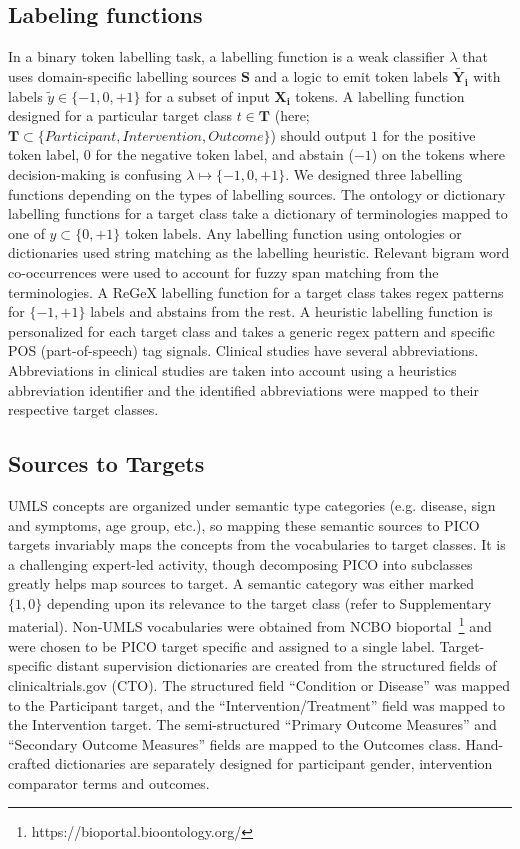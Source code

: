 \documentclass[10.7pt,]{article}
\begin{document}
\subsection{Labeling functions}\label{lfs}
%
In a binary token labelling task, a labelling function is a weak classifier $\lambda$ that uses domain-specific labelling sources $\bm{S}$ and a logic to emit token labels $ \widetilde{\bm{Y_{i}}}$ with labels $ \widetilde{y} \in \{-1, 0, +1\}$ for a subset of input $\bm{X_{i}}$ tokens.
A labelling function designed for a particular target class $t \in \bm{T}$ (here; $\bm{T} \subset \{ Participant, Intervention, Outcome \} $) should output  $1$ for the positive token label, $0$ for the negative token label, and abstain ($-1$) on the tokens where decision-making is confusing $\lambda \mapsto \{-1, 0, +1\}$.
We designed three labelling functions depending on the types of labelling sources.
The ontology or dictionary labelling functions for a target class take a dictionary of terminologies mapped to one of $y \subset \{0, +1\} $ token labels.
Any labelling function using ontologies or dictionaries used string matching as the labelling heuristic.
Relevant bigram word co-occurrences were used to account for fuzzy span matching from the terminologies.
A ReGeX labelling function for a target class takes regex patterns for $\{-1, +1\}$ labels and abstains from the rest.
A heuristic labelling function is personalized for each target class and takes a generic regex pattern and specific POS (part-of-speech) tag signals.
Clinical studies have several abbreviations.
Abbreviations in clinical studies are taken into account using a heuristics abbreviation identifier and the identified abbreviations were mapped to their respective target classes.
%
%
%
\subsection{Sources to Targets}\label{s2t}
%
UMLS concepts are organized under semantic type categories (e.g. disease, sign and symptoms, age group, etc.), so mapping these semantic sources to PICO targets invariably maps the concepts from the vocabularies to target classes.
It is a challenging expert-led activity, though decomposing PICO into subclasses greatly helps map sources to target.
A semantic category was either marked $\{1, 0\}$ depending upon its relevance to the target class (refer to Supplementary material).
Non-UMLS vocabularies were obtained from NCBO bioportal~\footnote{https://bioportal.bioontology.org/} and were chosen to be PICO target specific and assigned to a single label.
Target-specific distant supervision dictionaries are created from the structured fields of clinicaltrials.gov (CTO). 
The structured field ``Condition or Disease'' was mapped to the Participant target, and the ``Intervention/Treatment'' field was mapped to the Intervention target.
The semi-structured ``Primary Outcome Measures'' and ``Secondary Outcome Measures'' fields are mapped to the Outcomes class.
Hand-crafted dictionaries are separately designed for participant gender, intervention comparator terms and outcomes.
%
%
%
\end{document}
